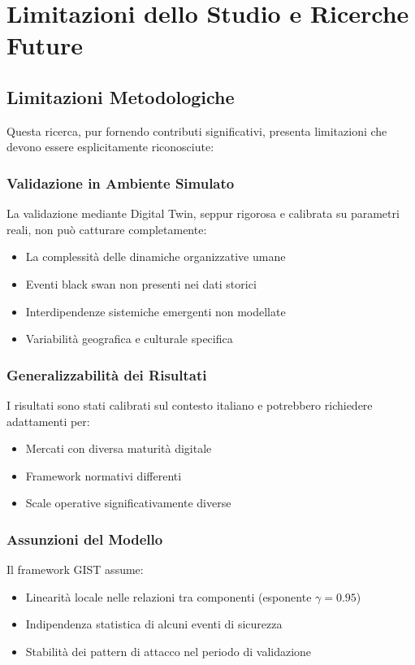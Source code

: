 \section{Limitazioni dello Studio e Ricerche Future}

\subsection{Limitazioni Metodologiche}

Questa ricerca, pur fornendo contributi significativi, presenta limitazioni che devono essere esplicitamente riconosciute:

\subsubsection{Validazione in Ambiente Simulato}
La validazione mediante Digital Twin, seppur rigorosa e calibrata su parametri reali, non può catturare completamente:
\begin{itemize}
\item La complessità delle dinamiche organizzative umane
\item Eventi black swan non presenti nei dati storici
\item Interdipendenze sistemiche emergenti non modellate
\item Variabilità geografica e culturale specifica
\end{itemize}

\subsubsection{Generalizzabilità dei Risultati}
I risultati sono stati calibrati sul contesto italiano e potrebbero richiedere adattamenti per:
\begin{itemize}
\item Mercati con diversa maturità digitale
\item Framework normativi differenti
\item Scale operative significativamente diverse
\end{itemize}

\subsubsection{Assunzioni del Modello}
Il framework GIST assume:
\begin{itemize}
\item Linearità locale nelle relazioni tra componenti (esponente $\gamma = 0.95$)
\item Indipendenza statistica di alcuni eventi di sicurezza
\item Stabilità dei pattern di attacco nel periodo di validazione
\end{itemize}


